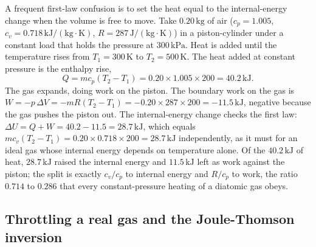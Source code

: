 A frequent first-law confusion is to set the heat equal to the
internal-energy change when the volume is free to move. Take
$0.20\,\text{kg}$ of air ($c_p = 1.005$, $c_v = 0.718\,\text{kJ}/
(\text{kg}\cdot\si{\kelvin})$, $R = 287\,\text{J}/(\text{kg}\cdot
\si{\kelvin})$) in a piston-cylinder under a constant load that holds the
pressure at $300\,\text{kPa}$. Heat is added until the temperature rises
from $T_1 = 300\,\si{\kelvin}$ to $T_2 = 500\,\si{\kelvin}$. The heat
added at constant pressure is the enthalpy rise,
\[
Q = m c_p (T_2 - T_1) = 0.20 \times 1.005 \times 200 = 40.2\,\text{kJ}.
\]
The gas expands, doing work on the piston. The boundary work on the gas
is $W = -p\,\Delta V = -mR(T_2 - T_1) = -0.20 \times 287 \times 200 =
-11.5\,\text{kJ}$, negative because the gas pushes the piston out. The
internal-energy change checks the first law:
$\Delta U = Q + W = 40.2 - 11.5 = 28.7\,\text{kJ}$, which equals
$m c_v (T_2 - T_1) = 0.20 \times 0.718 \times 200 = 28.7\,\text{kJ}$
independently, as it must for an ideal gas whose internal energy depends
on temperature alone. Of the $40.2\,\text{kJ}$ of heat, $28.7\,\text{kJ}$
raised the internal energy and $11.5\,\text{kJ}$ left as work against the
piston; the split is exactly $c_v/c_p$ to internal energy and $R/c_p$ to
work, the ratio $0.714$ to $0.286$ that every constant-pressure heating
of a diatomic gas obeys.

\subsection{Throttling a real gas and the Joule-Thomson inversion}

